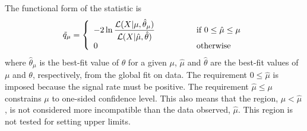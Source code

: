 The functional form of the statistic is 
\begin{eqnarray} 
\tilde{q}_\mu 
= 
\left\{ \begin{array}{l l}
\displaystyle
-2 \ln \frac{\mathcal{L} ( X | \mu, \hat{\theta}_\mu)}
            {\mathcal{L} ( X | \hat{\mu}, \hat{\theta})}  
            & \quad \quad \quad \quad \textrm{if } 0 \le \hat{\mu} \le \mu \\
0           & \quad \quad \quad \quad \textrm{otherwise}
\end{array} \right.
\end{eqnarray}  
where $\hat{\theta}_\mu$ is the best-fit value of $\theta$ for a given $\mu$, 
$\hat{\mu}$ and $\hat{\theta}$ are the best-fit values of 
$\mu$ and $\theta$, respectively, from the global fit on data.
The requirement $0 \le \hat{\mu}$ is imposed because the signal rate must be positive. 
The requirement $\hat{\mu} \le \mu$ constrains $\mu$ to one-sided confidence level. 
This also means that the region, $\mu < \hat{\mu}$, is not considered  
more incompatible than the data observed, $\hat{\mu}$. This region 
is not tested for setting upper limits.
%

